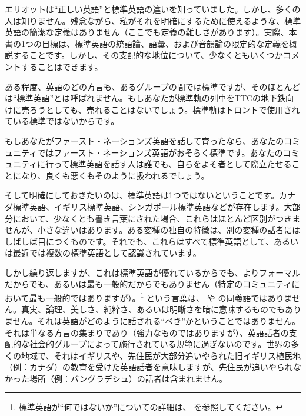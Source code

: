 エリオットは\enquote{正しい英語}と標準英語の違いを知っていました。しかし、多くの人は知りません。残念ながら、私がそれを明確にするために使えるような、標準英語の簡潔な定義はありません（ここでも定義の難しさがあります）。実際、本書の1つの目標は、標準英語の統語論、語彙、および音韻論の限定的な定義を概説することです。しかし、その支配的な地位について、少なくともいくつかコメントすることはできます。

ある程度、英語のどの方言も、あるグループの間では標準ですが、そのほとんどは\enquote{標準英語}とは呼ばれません。もしあなたが標準軌の列車をTTCの地下鉄向けに売ろうとしても、売れることはないでしょう。標準軌はトロントで使用されている標準ではないからです。

もしあなたがファースト・ネーションズ英語を話して育ったなら、あなたのコミュニティではファースト・ネーションズ英語がおそらく標準です。あなたのコミュニティに行って標準英語を話す人は誰でも、自らをよそ者として際立たせることになり、良くも悪くもそのように扱われるでしょう。

そして明確にしておきたいのは、標準英語は1つではないということです。カナダ標準英語、イギリス標準英語、シンガポール標準英語などが存在します。大部分において、少なくとも書き言葉にされた場合、これらはほとんど区別がつきませんが、小さな違いはあります。ある変種の独自の特徴は、別の変種の話者にはしばしば目につくものです。それでも、これらはすべて標準英語として、あるいは最近では複数の標準英語として認識されています。

しかし繰り返しますが、これは標準英語が優れているからでも、よりフォーマルだからでも、あるいは最も一般的だからでもありません（特定のコミュニティにおいて最も一般的ではありますが）。\footnote{標準英語が\enquote{何ではないか}についての詳細は、\citet{trudgill99} を参照してください。} という言葉は、 や  の同義語ではありません。真実、論理、美しさ、純粋さ、あるいは明晰さを暗に意味するものでもありません。それは英語がどのように話される\enquote{べき}かということではありません。それは単なる方言の集まりであり（強力なものではありますが）、英語話者の支配的な社会的グループによって施行されている規範に過ぎないのです。世界の多くの地域で、それはイギリスや、先住民が大部分追いやられた旧イギリス植民地（例：カナダ）の教育を受けた英語話者を意味しますが、先住民が追いやられなかった場所（例：バングラデシュ）の話者は含まれません。


